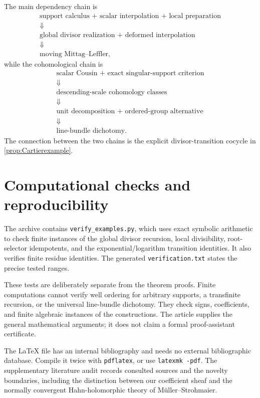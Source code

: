 \documentclass[11pt,letterpaper]{article}
\theoremstyle{definition}
\theoremstyle{remark}
\numberwithin{equation}{section}
\begin{document}
The main dependency chain is
\[
 \begin{gathered}
 \text{support calculus + scalar interpolation + local preparation}\\
 \Downarrow\\
 \text{global divisor realization + deformed interpolation}\\
 \Downarrow\\
 \text{moving Mittag--Leffler},
 \end{gathered}
\]
while the cohomological chain is
\[
 \begin{gathered}
 \text{scalar Cousin + exact singular-support criterion}\\
 \Downarrow\\
 \text{descending-scale cohomology classes}\\
 \Downarrow\\
 \text{unit decomposition + ordered-group alternative}\\
 \Downarrow\\
 \text{line-bundle dichotomy}.
 \end{gathered}
\]
The connection between the two chains is the explicit divisor-transition cocycle in \cref{prop:Cartierexample}.

\section{Computational checks and reproducibility}\label{app:checks}
The archive contains \texttt{verify\_examples.py}, which uses exact symbolic arithmetic to check finite instances of the global divisor recursion, local divisibility, root-selector idempotents, and the exponential/logarithm transition identities. It also verifies finite residue identities. The generated \texttt{verification.txt} states the precise tested ranges.

These tests are deliberately separate from the theorem proofs. Finite computations cannot verify well ordering for arbitrary supports, a transfinite recursion, or the universal line-bundle dichotomy. They check signs, coefficients, and finite algebraic instances of the constructions. The article supplies the general mathematical arguments; it does not claim a formal proof-assistant certificate.

The LaTeX file has an internal bibliography and needs no external bibliographic database. Compile it twice with \texttt{pdflatex}, or use \texttt{latexmk -pdf}. The supplementary literature audit records consulted sources and the novelty boundaries, including the distinction between our coefficient sheaf and the normally convergent Hahn-holomorphic theory of M\"uller--Strohmaier.
\end{document}
